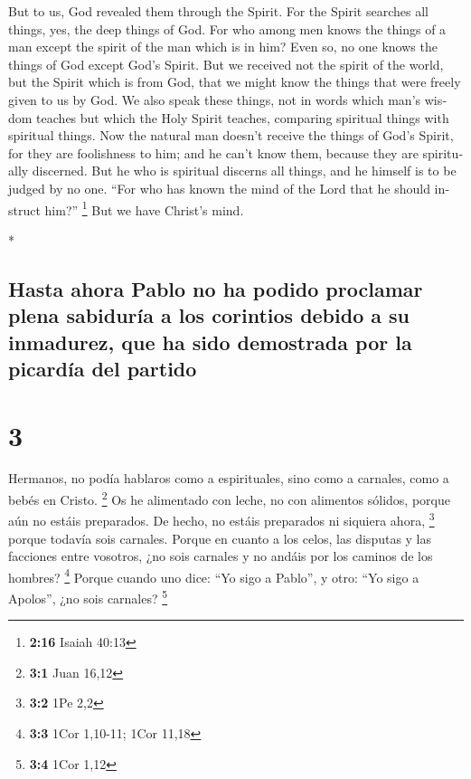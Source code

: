 \begin{paracol}{2}
\begin{otherlanguage}{english}
 But to us, God revealed them through the Spirit. For the
Spirit searches all things, yes, the deep things of God. 
For who among men knows the things of a man except the spirit of the man
which is in him? Even so, no one knows the things of God except God's
Spirit.  But we received not the spirit of the world, but
the Spirit which is from God, that we might know the things that were
freely given to us by God.  We also speak these things,
not in words which man's wisdom teaches but which the Holy Spirit
teaches, comparing spiritual things with spiritual things.
 Now the natural man doesn't receive the things of God's
Spirit, for they are foolishness to him; and he can't know them, because
they are spiritually discerned.  But he who is spiritual
discerns all things, and he himself is to be judged by no one.
 ``For who has known the mind of the Lord that he should
instruct him?'' \footnote{\textbf{2:16} Isaiah 40:13} But we have
Christ's mind.

\end{otherlanguage}

\switchcolumn[0]*

\hypertarget{hasta-ahora-pablo-no-ha-podido-proclamar-plena-sabiduruxeda-a-los-corintios-debido-a-su-inmadurez-que-ha-sido-demostrada-por-la-picarduxeda-del-partido}{%
\subsection{Hasta ahora Pablo no ha podido proclamar plena sabiduría a
los corintios debido a su inmadurez, que ha sido demostrada por la
picardía del
partido}\label{hasta-ahora-pablo-no-ha-podido-proclamar-plena-sabiduruxeda-a-los-corintios-debido-a-su-inmadurez-que-ha-sido-demostrada-por-la-picarduxeda-del-partido}}

\hypertarget{section-4}{%
\section{3}\label{section-4}}

 Hermanos, no podía hablaros como a espirituales, sino
como a carnales, como a bebés en Cristo. \footnote{\textbf{3:1} Juan
  16,12}  Os he alimentado con leche, no con alimentos
sólidos, porque aún no estáis preparados. De hecho, no estáis preparados
ni siquiera ahora, \footnote{\textbf{3:2} 1Pe 2,2}  porque
todavía sois carnales. Porque en cuanto a los celos, las disputas y las
facciones entre vosotros, ¿no sois carnales y no andáis por los caminos
de los hombres? \footnote{\textbf{3:3} 1Cor 1,10-11; 1Cor 11,18}
 Porque cuando uno dice: ``Yo sigo a Pablo'', y otro: ``Yo
sigo a Apolos'', ¿no sois carnales? \footnote{\textbf{3:4} 1Cor 1,12}


\end{paracol}
